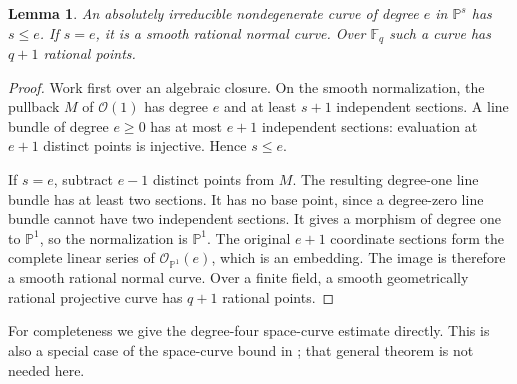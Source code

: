 \documentclass[11pt]{article}
\newtheorem{lemma}[theorem]{Lemma}
\theoremstyle{remark}\newtheorem{remark}[theorem]{Remark}
\newcommand{\F}{\mathbb F}
\newcommand{\PP}{\mathbb P}
\newcommand{\OO}{\mathcal O}
\begin{document}
\begin{lemma}\label{lem:minimal}
An absolutely irreducible nondegenerate curve of degree $e$ in $\PP^s$ has $s\le e$. If $s=e$, it is a smooth rational normal curve. Over $\F_q$ such a curve has $q+1$ rational points.
\end{lemma}
\begin{proof}
Work first over an algebraic closure. On the smooth normalization, the pullback $M$ of $\OO(1)$ has degree $e$ and at least $s+1$ independent sections. A line bundle of degree $e\ge0$ has at most $e+1$ independent sections: evaluation at $e+1$ distinct points is injective. Hence $s\le e$.

If $s=e$, subtract $e-1$ distinct points from $M$. The resulting degree-one line bundle has at least two sections. It has no base point, since a degree-zero line bundle cannot have two independent sections. It gives a morphism of degree one to $\PP^1$, so the normalization is $\PP^1$. The original $e+1$ coordinate sections form the complete linear series of $\OO_{\PP^1}(e)$, which is an embedding. The image is therefore a smooth rational normal curve. Over a finite field, a smooth geometrically rational projective curve has $q+1$ rational points.
\end{proof}

For completeness we give the degree-four space-curve estimate directly. This is also a special case of the space-curve bound in \cite[Theorem 3.11]{BM}; that general theorem is not needed here.
\end{document}
